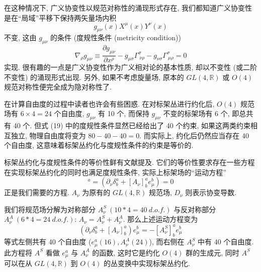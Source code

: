 \documentclass{article}
\begin{document}
 在这种情况下, 广义协变性以规范对称性的涌现形式存在, 我们都知道广义协变性是在``局域''平移下保持两矢量场内积
 \begin{equation}
 g_{\mu\nu}(x)X^{\mu}(x)Y^{\nu}(x)
 \end{equation}不变, 这由 $g_{\mu\nu}$ 的条件 (度规性条件 (metricity condition))
\begin{equation}
\nabla_{\rho}g_{\mu\nu}\equiv \frac{\partial g_{\mu\nu}}{\partial x^{\rho}}-g_{\mu\sigma}\Gamma_{\ \nu\rho}^{\sigma}-g_{\nu\sigma}\Gamma_{\ \mu\rho}^{\sigma}=0
\end{equation}
实现. 很有趣的一点是广义协变性作为广义相对论的基本性质, 却以不变性 (或二阶不变性) 的涌现形式出现. 另外, 如果不考虑旋量场, 原本的 $GL(4,\mathbb{R})$ 或 $O(4)$ 规范对称性便完全成为隐对称性了.

在计算自由度的过程中读者也许会有些困惑. 在对标架丛进行约化后, $O(4)$ 规范场有 $6\times4=24$ 个自由度, $g_{\mu\nu}$ 有 10 个, 而保持 $g_{\mu\nu}$ 不变的标架场有 6 个, 即总共有 40 个. 但式 (19) 中的度规性条件显然已经给出了 40 个约束, 如果这两类约束相互独立, 物理自由度将变为 $80-40-40=0$. 而实际上, 约化后仍然应当存在 40 个自由度, 这意味着标架丛约化与度规性条件的约束是等价的.

标架丛约化与度规性条件的等价性鲜有文献提及. 它们的等价性要求存在一些方程在实现标架丛约化的同时也满足度规性条件, 实际上标架场的``运动方程''
\begin{equation}
[D_{\nu}e_{\mu}]^{a}=(\partial_{\nu}\delta_{b}^{a}+[A_{\nu}]^{a}_{b}e_{\mu}^{b})=0
\end{equation}
正是我们需要的方程. $A_{\nu}$ 为原有的 $GL(4,\mathbb{R})$ 规范场, $D_{\nu}$ 则表示协变导数.

我们将规范场分解为对称部分 $A_{\nu}^{S}\ (10*4=40\ d.o.f.)$ 与反对称部分 $A_{\nu}^{A}\ (6*4=24\ d.o.f.)$: $A_{\nu}=A_{\nu}^{S}+A_{\nu}^{A}$. 那么上述运动方程变为
\begin{equation}
(\partial_{\nu}\delta_{b}^{a}+[A_{\nu}]^{a}_{b})e_{\mu}^{b}=-[A_{\nu}^{S}]_{b}^{a}e_{\mu}^{b}
\end{equation}
等式左侧共有 40 个自由度 ($e_{\mu}^{a}(16),A_{\nu}^{A}(24)$), 而右侧在 $A_{\nu}^{S}$ 中有 40 个自由度. 此方程将 $A^{S}$ 看做 $e_{\mu}^{a}$ 与 $A_{\nu}^{A}$ 的函数, 这时它是约化 $O(4)$ 群的生成元, 同时 $A^{S}$ 可以在从 $GL(4,\mathbb{R})$ 到 $O(4)$ 的丛变换中实现标架丛约化.
\end{document}
